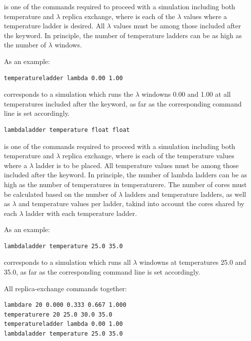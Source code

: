 \documentclass[letterpaper,10pt,english]{manual}
\begin{document}
is one of the commands required to proceed with a simulation including both temperature and $\lambda$ replica exchange, where  is each of the $\lambda$ values where a temperature ladder is desired. All $\lambda$ values must be among those included after the  keyword. In principle, the number of temperature ladders can be as high as the number of $\lambda$ windows.

As an example:

\begin{Verbatim}[commandchars=@\[\]]
temperatureladder lambda 0.00 1.00
\end{Verbatim}

corresponds to a simulation which runs the $\lambda$ windowns 0.00 and 1.00 at all temperatures included after the  keyword, as far as the corresponding  command line is set accordingly.
\begin{Verbatim}[commandchars=@\[\]]
lambdaladder temperature float float
\end{Verbatim}

is one of the commands required to proceed with a simulation including both temperature and $\lambda$ replica exchange, where  is each of the temperature values where a $\lambda$ ladder is to be placed. All temperature values must be among those included after the  keyword. In principle, the number of lambda ladders can be as high as the number of temperatures in temperaturere. The number of cores must be calculated based on the number of $\lambda$ ladders and temperature ladders, as well as $\lambda$ and temperature values per ladder, takind into account the cores shared by each $\lambda$ ladder with each temperature ladder.

As an example:

\begin{Verbatim}[commandchars=@\[\]]
lambdaladder temperature 25.0 35.0
\end{Verbatim}

corresponds to a simulation which runs all $\lambda$ windowns at temperatures 25.0 and 35.0, as far as the corresponding  command line is set accordingly.

All replica-exchange commands together:

\begin{Verbatim}[commandchars=@\[\]]
lambdare 20 0.000 0.333 0.667 1.000
temperaturere 20 25.0 30.0 35.0
temperatureladder lambda 0.00 1.00
lambdaladder temperature 25.0 35.0
\end{Verbatim}
\end{document}
